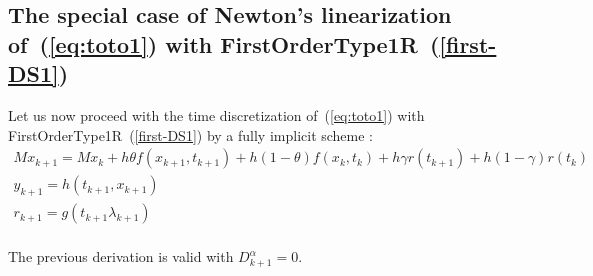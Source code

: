 \subsection{The special case of Newton's linearization of~(\ref{eq:toto1}) with FirstOrderType1R~(\ref{first-DS1})}


Let us now proceed with the time discretization of~(\ref{eq:toto1}) with FirstOrderType1R~(\ref{first-DS1})  by a fully implicit scheme :
\begin{equation}
  \begin{array}{l}
    \label{eq:mlcp3-toto1-DS1}
     M x_{k+1} = M x_{k} +h\theta f(x_{k+1},t_{k+1})+h(1-\theta) f(x_k,t_k) + h \gamma r(t_{k+1})
     + h(1-\gamma)r(t_k)  \\[2mm]
     y_{k+1} =  h(t_{k+1},x_{k+1}) \\[2mm]
     r_{k+1} = g(t_{k+1}\lambda_{k+1})\\[2mm]
  \end{array}
\end{equation}

The previous derivation is valid with $ D^{\alpha}_{k+1} =0$.



